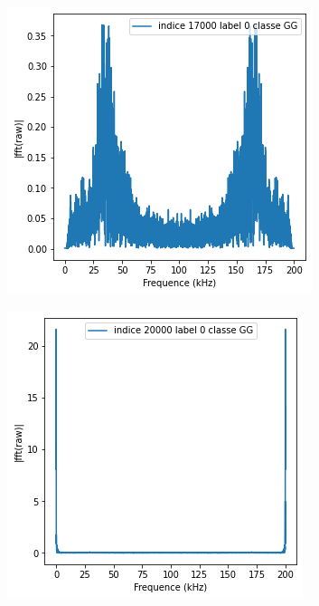 \begin{figure}[!h]
\centering
  \begin{subfigure}[b]{0.2\textwidth}
    \includegraphics[width=\textwidth]{./images/17000fft.png}
  \end{subfigure}
  \begin{subfigure}[b]{0.2\textwidth}
    \includegraphics[width=\textwidth]{./images/20000fft.png}

\end{subfigure}
\end{figure}
